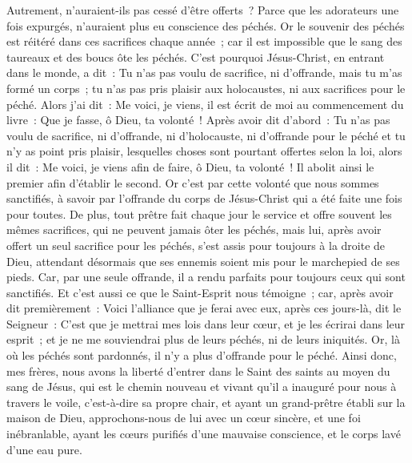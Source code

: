 \begin{multicols}{2}
Autrement, n'auraient-ils pas cessé d'être offerts~? Parce que les adorateurs une fois expurgés, n'auraient plus eu conscience des péchés.
Or le souvenir des péchés est réitéré dans ces sacrifices chaque année~;
car il est impossible que le sang des taureaux et des boucs ôte les péchés.
C'est pourquoi Jésus-Christ, en entrant dans le monde, a dit~: Tu n'as pas voulu de sacrifice, ni d'offrande, mais tu m'as formé un corps~;
tu n'as pas pris plaisir aux holocaustes, ni aux sacrifices pour le péché.
Alors j'ai dit~: Me voici, je viens, il est écrit de moi au commencement du livre~: Que je fasse, ô Dieu, ta volonté~!
Après avoir dit d'abord~: Tu n'as pas voulu de sacrifice, ni d'offrande, ni d'holocauste, ni d'offrande pour le péché et tu n'y as point pris plaisir, lesquelles choses sont pourtant offertes selon la loi, alors il dit~: Me voici, je viens afin de faire, ô Dieu, ta volonté~!
Il abolit ainsi le premier afin d'établir le second.
Or c'est par cette volonté que nous sommes sanctifiés, à savoir par l'offrande du corps de Jésus-Christ qui a été faite une fois pour toutes.
De plus, tout prêtre fait chaque jour le service et offre souvent les mêmes sacrifices, qui ne peuvent jamais ôter les péchés,
mais lui, après avoir offert un seul sacrifice pour les péchés, s'est assis pour toujours à la droite de Dieu,
attendant désormais que ses ennemis soient mis pour le marchepied de ses pieds.
Car, par une seule offrande, il a rendu parfaits pour toujours ceux qui sont sanctifiés.
Et c'est aussi ce que le Saint-Esprit nous témoigne~; car, après avoir dit premièrement~:
Voici l'alliance que je ferai avec eux, après ces jours-là, dit le Seigneur~: C'est que je mettrai mes lois dans leur cœur, et je les écrirai dans leur esprit~;
et je ne me souviendrai plus de leurs péchés, ni de leurs iniquités.
Or, là où les péchés sont pardonnés, il n'y a plus d'offrande pour le péché.
Ainsi donc, mes frères, nous avons la liberté d'entrer dans le Saint des saints au moyen du sang de Jésus,
qui est le chemin nouveau et vivant qu'il a inauguré pour nous à travers le voile, c'est-à-dire sa propre chair,
et ayant un grand-prêtre établi sur la maison de Dieu,
approchons-nous de lui avec un cœur sincère, et une foi inébranlable, ayant les cœurs purifiés d'une mauvaise conscience, et le corps lavé d'une eau pure.

\end{multicols}
